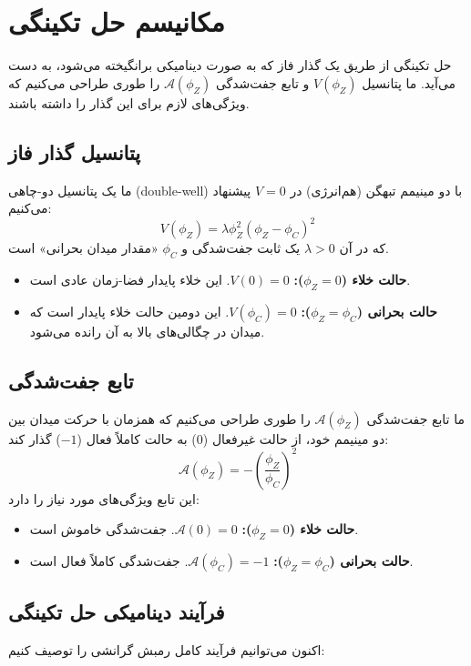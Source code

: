 \documentclass[12pt, a4paper]{article}
\newcommand{\phiZ}{\phi_Z}
\newcommand{\Aphi}{\mathcal{A}(\phiZ)}
\newcommand{\Vphi}{V(\phiZ)}
\newcommand{\phiC}{\phi_C}
\begin{document}
\section{مکانیسم حل تکینگی}

حل تکینگی از طریق یک گذار فاز که به صورت دینامیکی برانگیخته می‌شود، به دست می‌آید. ما پتانسیل $\Vphi$ و تابع جفت‌شدگی $\Aphi$ را طوری طراحی می‌کنیم که ویژگی‌های لازم برای این گذار را داشته باشند.

\subsection{پتانسیل گذار فاز}
ما یک پتانسیل دو-چاهی (double-well) با دو مینیمم تبهگن (هم‌انرژی) در $V=0$ پیشنهاد می‌کنیم:
\begin{equation}
\Vphi = \lambda \phiZ^2 (\phiZ - \phiC)^2
\end{equation}
که در آن $\lambda > 0$ یک ثابت جفت‌شدگی و $\phiC$ «مقدار میدان بحرانی» است.
\begin{itemize}
    \item \textbf{حالت خلاء ($\phiZ=0$):} $V(0) = 0$. این خلاء پایدار فضا-زمان عادی است.
    \item \textbf{حالت بحرانی ($\phiZ=\phiC$):} $V(\phiC) = 0$. این دومین حالت خلاء پایدار است که میدان در چگالی‌های بالا به آن رانده می‌شود.
\end{itemize}

\subsection{تابع جفت‌شدگی}
ما تابع جفت‌شدگی $\Aphi$ را طوری طراحی می‌کنیم که همزمان با حرکت میدان بین دو مینیمم خود، از حالت غیرفعال (0) به حالت کاملاً فعال ($-1$) گذار کند:
\begin{equation}
\Aphi = - \left( \frac{\phiZ}{\phiC} \right)^2
\end{equation}
این تابع ویژگی‌های مورد نیاز را دارد:
\begin{itemize}
    \item \textbf{حالت خلاء ($\phiZ=0$):} $\mathcal{A}(0) = 0$. جفت‌شدگی خاموش است.
    \item \textbf{حالت بحرانی ($\phiZ=\phiC$):} $\mathcal{A}(\phiC) = -1$. جفت‌شدگی کاملاً فعال است.
\end{itemize}

\subsection{فرآیند دینامیکی حل تکینگی}
اکنون می‌توانیم فرآیند کامل رمبش گرانشی را توصیف کنیم:
\end{document}
